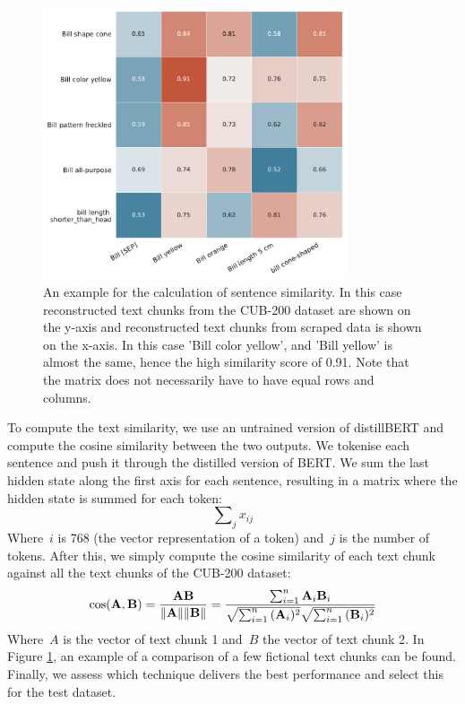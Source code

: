 \documentclass[a4paper, 12pt, oneside]{book} %
\begin{document}
\begin{figure} [htbp]
    \centering
    \hspace{-3cm}
    \includegraphics[width=0.8\textwidth]{similarity_matrix.pdf}
    \caption[Example of sentence similarity]{An example for the calculation of sentence similarity. 
    In this case reconstructed text chunks from the CUB-200 dataset are shown on the y-axis and reconstructed text chunks from scraped data is shown on the x-axis. In this case 'Bill color yellow', and 'Bill yellow' is almost the same, hence the high similarity score of 0.91. Note that the matrix does not necessarily have to have equal rows and columns.}
    \label{fig:similarity_matrix}
\end{figure}



To compute the text similarity, we use an untrained version of distillBERT and compute the cosine similarity between the two outputs.
We tokenise each sentence and push it through the distilled version of BERT.
We sum the last hidden state along the first axis for each sentence, resulting in a matrix where the hidden state is summed for each token:
\begin{equation}
     \sum\nolimits_{j}^{} x_{ij} 
\end{equation}
Where~$i$ is 768 (the vector representation of a token) and~$j$ is the number of tokens. 
After this, we simply compute the cosine similarity of each text chunk against all the text chunks of the CUB-200 dataset:
\begin{equation}
\cos ({\bf A},{\bf B})= {{\bf A} {\bf B} \over \|{\bf A}\| \|{\bf B}\|} = \frac{ \sum_{i=1}^{n}{{\bf A}_i{\bf B}_i} }{ \sqrt{\sum_{i=1}^{n}{({\bf A}_i)^2}} \sqrt{\sum_{i=1}^{n}{({\bf B}_i)^2}} }
\end{equation}
Where~$A$ is the vector of text chunk 1 and~$B$ the vector of text chunk 2. 
In Figure \ref{fig:similarity_matrix}, an example of a comparison of a few fictional text chunks can be found. 
Finally, we assess which technique delivers the best performance and select this for the test dataset.
\end{document}
